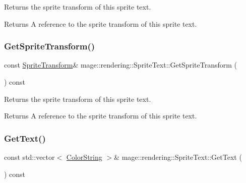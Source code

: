 Returns the sprite transform of this sprite text.

\begin{DoxyReturn}{Returns}
A reference to the sprite transform of this sprite text. 
\end{DoxyReturn}
\hypertarget{classmage_1_1rendering_1_1_sprite_text_a9b0bc8d9c8e123d49bd6cc9dcc35c06d}{}\label{classmage_1_1rendering_1_1_sprite_text_a9b0bc8d9c8e123d49bd6cc9dcc35c06d} 
\subsubsection{\texorpdfstring{Get\+Sprite\+Transform()}{GetSpriteTransform()}\hspace{0.1cm}{\footnotesize\ttfamily [2/2]}}
{\footnotesize\ttfamily const \hyperlink{classmage_1_1_sprite_transform}{Sprite\+Transform}\& mage\+::rendering\+::\+Sprite\+Text\+::\+Get\+Sprite\+Transform (\begin{DoxyParamCaption}{ }\end{DoxyParamCaption}) const\hspace{0.3cm}{\ttfamily [noexcept]}}

Returns the sprite transform of this sprite text.

\begin{DoxyReturn}{Returns}
A reference to the sprite transform of this sprite text. 
\end{DoxyReturn}
\hypertarget{classmage_1_1rendering_1_1_sprite_text_a3a07e4043ce7058cb157111738c664cb}{}\label{classmage_1_1rendering_1_1_sprite_text_a3a07e4043ce7058cb157111738c664cb} 
\subsubsection{\texorpdfstring{Get\+Text()}{GetText()}}
{\footnotesize\ttfamily const std\+::vector$<$ \hyperlink{classmage_1_1rendering_1_1_color_string}{Color\+String} $>$\& mage\+::rendering\+::\+Sprite\+Text\+::\+Get\+Text (\begin{DoxyParamCaption}{ }\end{DoxyParamCaption}) const\hspace{0.3cm}{\ttfamily [noexcept]}}

